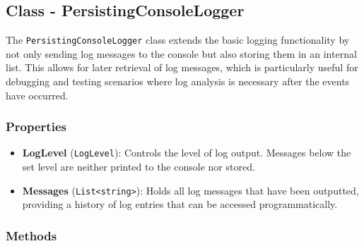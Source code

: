 \documentclass[12pt]{article}
\begin{document}
\newpage
\subsection*{Class - PersistingConsoleLogger}

The \texttt{PersistingConsoleLogger} class extends the basic logging functionality by not only sending log messages to the console but also storing them in an internal list. This allows for later retrieval of log messages, which is particularly useful for debugging and testing scenarios where log analysis is necessary after the events have occurred.

\subsubsection*{Properties}

\begin{itemize}
    \item \textbf{LogLevel} (\texttt{LogLevel}): Controls the level of log output. Messages below the set level are neither printed to the console nor stored.
    \item \textbf{Messages} (\texttt{List<string>}): Holds all log messages that have been outputted, providing a history of log entries that can be accessed programmatically.
\end{itemize}

\subsubsection*{Methods}
\end{document}
